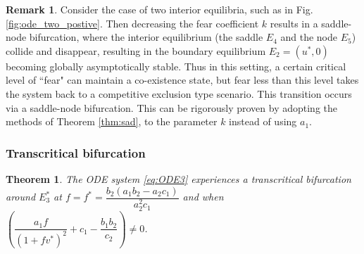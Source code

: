 \documentclass[10pt]{amsart}
\newtheorem{theorem}{Theorem}[section]
\theoremstyle{definition}
\newtheorem{remark}{Remark}
\begin{document}
\begin{remark}
	Consider the case of two interior equilibria, such as in Fig. \ref{fig:ode_two_postive}. Then decreasing the fear coefficient $k$ results in a saddle-node bifurcation, where the interior equilibrium (the saddle $E_{4}$ and the node $E_{5}$) collide and disappear, resulting in the boundary equilibrium $E_{2} = (u^{*},0)$ becoming globally asymptotically stable. Thus in this setting, a certain critical level of ``fear" can maintain a co-existence state, but fear less than this level takes the system back to a competitive exclusion type scenario. This transition occurs via a saddle-node bifurcation.
	This can be rigorously proven by adopting the methods of Theorem \ref{thm:sad}, to the parameter $k$ instead of using $a_{1}$.
\end{remark}

\subsubsection{Transcritical bifurcation}

\begin{theorem}
\label{thm:tc}
The ODE system \eqref{eq:ODE3} experiences a transcritical bifurcation around $E_3^*$ at $f=f^*=\dfrac{b_2 \left(a_1 b_2-a_2 c_1\right)}{a_2^2 c_1}$ and when $\left(\dfrac{a_1f}{\left(1+fv^*\right)^2}+c_1-\dfrac{b_1 b_2}{c_2} \right) \neq 0$.
\end{theorem}
\end{document}
